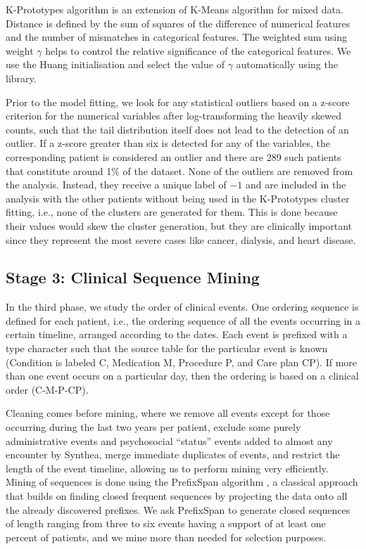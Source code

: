K-Prototypes algorithm \cite{huang1998} is an extension of K-Means algorithm for mixed data. Distance is defined by the sum of squares of the difference of numerical features and the number of mismatches in categorical features. The weighted sum using weight $\gamma$ helps to control the relative significance of the categorical features. We use the Huang initialisation and select the value of $\gamma$ automatically using the library.

Prior to the model fitting, we look for any statistical outliers based on a z-score criterion for the numerical variables after log-transforming the heavily skewed counts, such that the tail distribution itself does not lead to the detection of an outlier. If a z-score greater than six is detected for any of the variables, the corresponding patient is considered an outlier and there are 289 such patients that constitute around 1\% of the dataset. None of the outliers are removed from the analysis. Instead, they receive a unique label of $-1$ and are included in the analysis with the other patients without being used in the K-Prototypes cluster fitting, i.e., none of the clusters are generated for them. This is done because their values would skew the cluster generation, but they are clinically important since they represent the most severe cases like cancer, dialysis, and heart disease.

\subsection{Stage 3: Clinical Sequence Mining}

In the third phase, we study the order of clinical events. One ordering sequence is defined for each patient, i.e., the ordering sequence of all the events occurring in a certain timeline, arranged according to the dates. Each event is prefixed with a type character such that the source table for the particular event is known (Condition is labeled C, Medication M, Procedure P, and Care plan CP). If more than one event occurs on a particular day, then the ordering is based on a clinical order (C-M-P-CP).

Cleaning comes before mining, where we remove all events except for those occurring during the last two years per patient, exclude some purely administrative events and psychosocial ``status'' events added to almost any encounter by Synthea, merge immediate duplicates of events, and restrict the length of the event timeline, allowing us to perform mining very efficiently. Mining of sequences is done using the PrefixSpan algorithm \cite{pei2001}, a classical approach that builds on finding closed frequent sequences by projecting the data onto all the already discovered prefixes. We ask PrefixSpan to generate closed sequences of length ranging from three to six events having a support of at least one percent of patients, and we mine more than needed for selection purposes.

